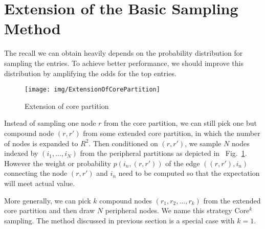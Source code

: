 \documentclass[10pt,journal,compsoc]{IEEEtran}
\newcommand{\Fig}[1]{Fig.~\ref{fig:#1}}
\begin{document}
\section{Extension of the Basic Sampling Method} 


The recall we can obtain heavily depends on the probability distribution for sampling the entries. To achieve better performance, we should improve this distribution by amplifying the odds for the top entries.
\begin{figure}[tph!]
	\centering
	\texttt{[image: img/ExtensionOfCorePartition]}
	\caption{Extension of core partition}
	\label{fig:ExtensionOfCorePartition}
\end{figure}

Instead of sampling one node $r$ from the core partition,
we can still pick one but compound node $(r,r')$ from some extended core partition,
in which the number of nodes is expanded to $R^2$.
Then conditioned on $(r,r')$, we sample $N$ nodes  
indexed by $(i_1,\ldots,i_N)$ from the peripheral partitions as depicted in ~\Fig{ExtensionOfCorePartition}. However the weight or probability $p(i_n,(r,r'))$ of the edge $((r,r'),i_n)$ connecting the node $(r,r')$ and $i_n$ need to be computed so that the expectation will meet actual value.

More generally, we can pick $k$ compound nodes $(r_1,r_2,\ldots,r_k)$ from the extended core partition
and then draw $N$ peripheral nodes.
We name this strategy Core$^k$ sampling.
The method discussed in previous section is a special case with $k=1$.
\end{document}
